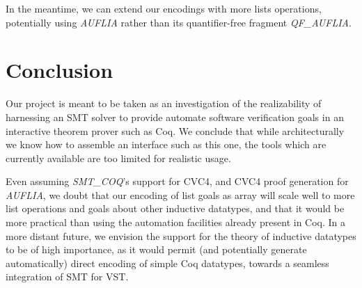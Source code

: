 \documentclass[onecolumn, preprint]{sigplanconf}
\begin{document}
In the meantime, we can extend our encodings with more lists operations, potentially using \emph{AUFLIA} rather than its quantifier-free fragment \emph{QF\_AUFLIA}.

\section{Conclusion}
\label{sec:conclusion}
Our project is meant to be taken as an investigation of the realizability of harnessing an SMT solver to provide automate software verification goals in an interactive theorem prover such as Coq. We conclude that while architecturally we know how to assemble an interface such as this one, the tools which are currently available are too limited for realistic usage.




Even assuming \emph{SMT\_COQ}'s support for CVC4, and CVC4 proof generation for \emph{AUFLIA}, we doubt that our encoding of list goals as array will scale well to more list operations and goals about other inductive datatypes, and that it would be more practical than using the automation facilities already present in Coq. In a more distant future, we envision the support for the theory of inductive datatypes to be of high importance, as it would permit (and potentially generate automatically)  direct encoding of simple Coq datatypes, towards a seamless integration of SMT for VST.



\end{document}
